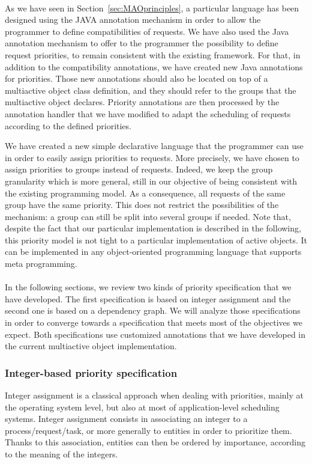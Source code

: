 \documentclass[11pt]{report}
\begin{document}
\paragraph{}
As we have seen in Section~\ref{sec:MAOprinciples}, a particular language has been designed using the JAVA annotation mechanism in order to allow the programmer to define compatibilities of requests. We have also used the Java annotation mechanism to offer to the programmer the possibility to define request priorities, to remain consistent with the existing framework. For that, in addition to the compatibility annotations, we have created new Java annotations for priorities. Those new annotations should also be located on top of a multiactive object class definition, and they should refer to the groups that the multiactive object declares. 
Priority annotations are then processed by the annotation handler that we have modified to adapt the scheduling of requests according to the defined priorities.

We have created a new simple declarative language that the programmer can use in order to easily assign priorities to requests. More precisely, we have chosen to assign priorities to groups instead of requests. Indeed, we keep the group granularity which is more general, still in our objective of being consistent with the existing programming model. As a consequence, all requests of the same group have the same priority. This does not restrict the possibilities of the mechanism: a group can still be split into several groups if needed.
Note that, despite the fact that our particular implementation is described in the following, this priority model is not tight to a particular implementation of active objects. It can be implemented in any object-oriented programming language that supports meta programming.

\paragraph{}
In the following sections, we review two kinds of priority specification that we have developed. The first specification is based on integer assignment and the second one is based on a dependency graph. We will analyze those specifications in order to converge towards a specification that meets most of the objectives we expect. Both specifications use customized annotations that we have developed in the current multiactive object implementation. 

\subsubsection{Integer-based priority specification}
Integer assignment is a classical approach when dealing with priorities, mainly at the operating system level, but also at most of application-level scheduling systems. Integer assignment consists in associating an integer to a process/request/task, or more generally to entities in order to prioritize them. Thanks to this association, entities can then be ordered by importance, according to the meaning of the integers.
\end{document}
